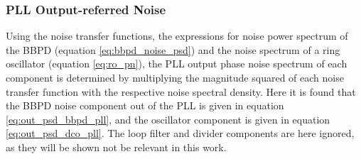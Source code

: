 	\subsubsection{PLL Output-referred Noise}\label{sec:pll_output_noise}
		Using the noise transfer functions, the expressions for noise power spectrum of the BBPD (equation \ref{eq:bbpd_noise_psd}) and the noise spectrum of a ring oscillator (equation \ref{eq:ro_pn}), the PLL output phase noise spectrum of each component is determined by multiplying the magnitude squared of each noise transfer function with the respective noise spectral density. Here it is found that the BBPD noise component out of the PLL is given in equation \ref{eq:out_psd_bbpd_pll}, and the oscillator component is given in equation \ref{eq:out_psd_dco_pll}. The loop filter and divider components are here ignored, as they will be shown not be relevant in this work. 

